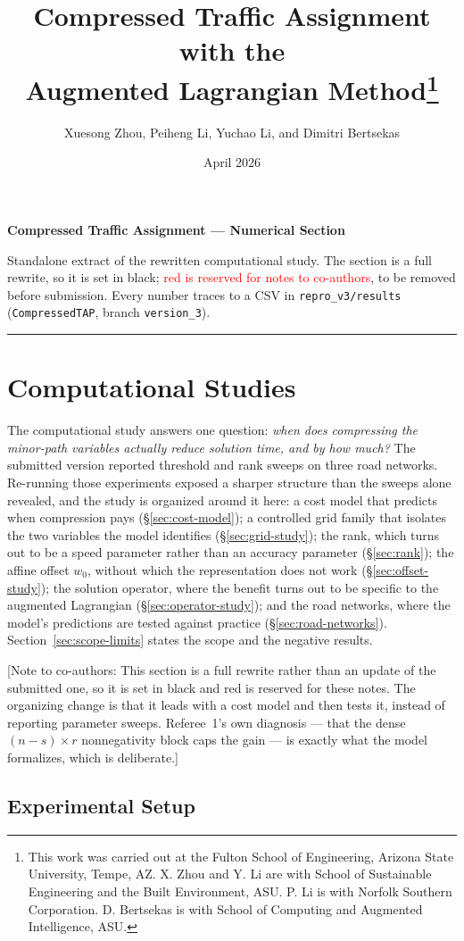 \documentclass[11pt]{article}
\title{Compressed Traffic Assignment with the \\Augmented Lagrangian Method\footnote{
This work was carried out at the Fulton School of Engineering, Arizona State University, Tempe, AZ. X. Zhou and Y. Li are with School of Sustainable Engineering and the Built Environment, ASU. P. Li is with Norfolk Southern Corporation. D. Bertsekas is with School of Computing and Augmented Intelligence, ASU.}}
\author{Xuesong Zhou, Peiheng Li, Yuchao Li, and Dimitri Bertsekas}
\date{April 2026}
\newcommand{\conote}[1]{{\color{red}\small\textsf{[Note to co-authors: #1]}}}
\begin{document}
{\Large\bfseries Compressed Traffic Assignment --- Numerical Section}\par
\vspace{2pt}
{\small Standalone extract of the rewritten computational study. The section is a full
rewrite, so it is set in black; \textcolor{red}{red is reserved for notes to co-authors},
to be removed before submission. Every number traces to a CSV in
\texttt{repro\_v3/results} (\texttt{CompressedTAP}, branch \texttt{version\_3}).}
\vspace{8pt}\hrule\vspace{8pt}
\section{Computational Studies}
\label{sec:experiments}
\label{sec:experiments}\label{sec:computational}


The computational study answers one question: \emph{when does compressing the minor-path
variables actually reduce solution time, and by how much?} The submitted version reported
threshold and rank sweeps on three road networks. Re-running those experiments exposed a
sharper structure than the sweeps alone revealed, and the study is organized around it here:
a cost model that predicts when compression pays (\S\ref{sec:cost-model}); a controlled grid
family that isolates the two variables the model identifies (\S\ref{sec:grid-study}); the
rank, which turns out to be a speed parameter rather than an accuracy parameter
(\S\ref{sec:rank}); the affine offset $w_0$, without which the representation does not work
(\S\ref{sec:offset-study}); the solution operator, where the benefit turns out to be specific
to the augmented Lagrangian (\S\ref{sec:operator-study}); and the road networks, where the
model's predictions are tested against practice (\S\ref{sec:road-networks}).
Section~\ref{sec:scope-limits} states the scope and the negative results.

\conote{This section is a full rewrite rather than an update of the submitted one, so it is
set in black and red is reserved for these notes. The organizing change is that it leads with
a cost model and then tests it, instead of reporting parameter sweeps. Referee~1's own
diagnosis --- that the dense $(n-s)\times r$ nonnegativity block caps the gain --- is exactly
what the model formalizes, which is deliberate.}


\subsection{Experimental Setup}
\label{sec:setup}
\end{document}

